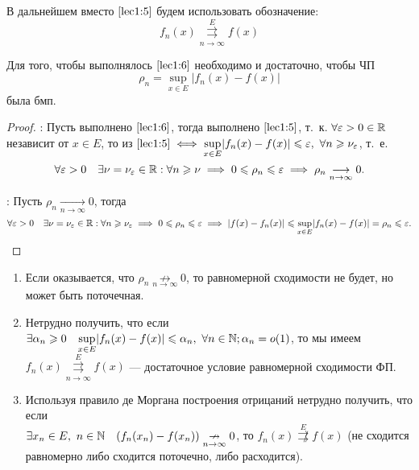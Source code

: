 \documentclass[../../main.tex]{subfiles}
\begin{document}
В дальнейшем вместо $\eqref{lec1:5}$ будем использовать обозначение:
\begin{equation}
\label{lec1:6}
f_n(x) \overset{E}{\underset{n \to \infty}\rightrightarrows} f(x)
\end{equation}
\begin{thm} 
Для того, чтобы выполнялось $\eqref{lec1:6}$ необходимо и достаточно, чтобы
ЧП \begin{equation}
\label{lec1:7}
\rho_n = \underset{x \in E}{\sup}|f_n(x) - f(x)| 
\end{equation} была бмп.
\end{thm}
\begin{proof}
 \;

 \nec: Пусть выполнено $\eqref{lec1:6}$, тогда выполнено $\eqref{lec1:5}$,
 т.~к. $\forall \varepsilon > 0 \in \mathbb{R}$ независит от $x \in E$, 
 то из $\eqref{lec1:5} \iff 
 \underset{x \in E}{\sup}|f_n(x) - f(x)| \leq \eps,\ 
 \forall n \geq \nu_\eps$, т.~е.
 \[\forall \varepsilon > 0 \quad \exists \nu = \nu_\varepsilon \in \mathbb{R} : 
 \forall n \geqslant \nu \implies 
 0 \leqslant \rho_n \leqslant \varepsilon \implies 
 \rho_n \underset{n \to \infty}{\longrightarrow}0.\]

 \suff: Пусть $\rho_n \underset{n \to \infty}{\longrightarrow}0$, тогда
\[\forall \varepsilon > 0 \quad \exists \nu = \nu_\varepsilon \in \mathbb{R} :
\forall n \geqslant \nu_\varepsilon \implies  
0 \leqslant \rho_n \leqslant \varepsilon \implies |f(x)-f_n(x)| \leqslant 
\underset{x \in E}{\sup}|f_n(x) - f(x)|
= \rho_n \leqslant \varepsilon. \qedhere\]
\end{proof}

\begin{rem}
	\;
 \begin{enumerate}
		\item Если оказывается, что 
$\rho_n \underset{n \to \infty}{\not \rightarrow}0$, 
то равномерной сходимости не будет, но может быть поточечная.

		\item Нетрудно получить, что если $\exists \alpha_n \geqslant 0 \quad 
\underset{x \in E}{\sup}|f_n(x) - f(x)| \leqslant \alpha_n,\ \forall n \in \mathbb{N};
\alpha_n = o(1)$, то мы имеем
$f_n(x) \overset{E}{\underset{n \to \infty}\rightrightarrows} f(x)$ ---
достаточное условие равномерной сходимости ФП.

		\item Используя правило де Моргана 
построения отрицаний нетрудно получить,
что если \\ $\exists x_n \in E,\ n \in \mathbb{N} \quad (f_n(x_n) - f(x_n))
\underset{n \to \infty}{\nrightarrow}0$, то 
$f_n(x) \overset{E}{\not \rightrightarrows} f(x)$ (не сходится 
равномерно либо сходится поточечно, либо расходится).
 \end{enumerate}	
\end{rem}	
\end{document}
